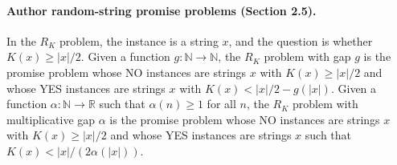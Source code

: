 \documentclass[10pt,a4paper]{article}
\begin{document}
\paragraph{Author random-string promise problems (Section 2.5).}
In the $R_K$ problem, the instance is a string $x$, and the question is whether $K(x)\geq|x|/2$. Given a function $g:\mathbb N\to\mathbb N$, the $R_K$ problem with gap $g$ is the promise problem whose NO instances are strings $x$ with $K(x)\geq|x|/2$ and whose YES instances are strings $x$ with $K(x)<|x|/2-g(|x|)$. Given a function $\alpha:\mathbb N\to\mathbb R$ such that $\alpha(n)\geq1$ for all $n$, the $R_K$ problem with multiplicative gap $\alpha$ is the promise problem whose NO instances are strings $x$ with $K(x)\geq|x|/2$ and whose YES instances are strings $x$ such that $K(x)<|x|/(2\alpha(|x|))$.
\end{document}
